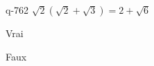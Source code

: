 \begin{truefalse}{q-762}
$\sqrt{2}(\sqrt{2}+\sqrt{3})=2+\sqrt{6}$
\item* Vrai
\item Faux
\end{truefalse}

